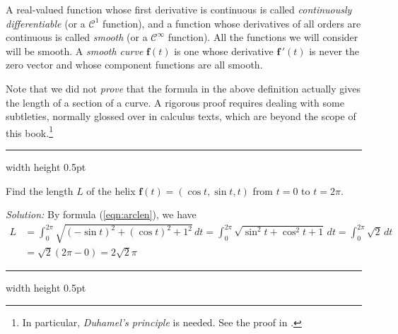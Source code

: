 
A real-valued function whose first derivative is continuous is called
\emph{continuously differentiable} (or a $\mathcal{C}^1$
function), and a function whose derivatives of all orders are continuous is called \emph{smooth} 
(or a $\mathcal{C}^{\infty}$ function). All the functions we will consider will be
smooth. A \emph{smooth curve} $\textbf{f}(t)$ is one whose derivative $\textbf{f}\,'(t)$ is never the zero vector and
whose component functions are all smooth.

Note that we did not \emph{prove} that the formula in the above definition actually gives the length of a
section of a curve. A rigorous proof requires dealing with some subtleties, normally glossed over in calculus texts,
which are beyond the scope of this book.\footnote{In particular, \emph{Duhamel's principle} is needed. See the proof in
\cite[\S\,14.2 and \S\,18.2]{tm}.}

\vspace{2mm}
\hrule width \textwidth height 0.5pt
\begin{exmp}\label{exmp:arclenhelix}
 Find the length $L$ of the helix $\textbf{f}(t) = ( \cos t , \sin t , t )$ from $t = 0$ to $t =
 2\pi$.\vspace{1mm}
 \par\noindent \emph{Solution:} By formula (\ref{eqn:arclen}), we have
 \begin{align*}
  L &= \int_{0}^{2\pi} \sqrt{(-\sin t)^2 + (\cos t)^2 + 1^2}\,dt = \int_{0}^{2\pi} \sqrt{\sin^2 t + \cos^2 t + 1}\,dt =
  \int_{0}^{2\pi} \sqrt{2}\,dt\\
  &= \sqrt{2} (2\pi - 0) = 2\sqrt{2}\pi
 \end{align*}
\end{exmp}
\hrule width \textwidth height 0.5pt
\vspace{2mm}


